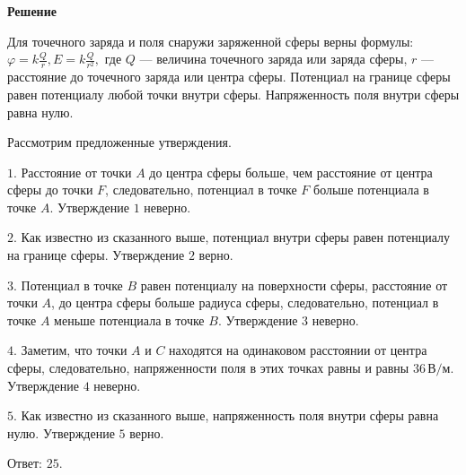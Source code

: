 \documentclass[12pt,a4paper]{article}
\begin{document}
{\begin{center}\end{center}
\par
}{
\smallskip\noindent\textbf{Решение}\par
Для точечного заряда и поля снаружи заряженной сферы верны формулы: $\varphi = k \frac{ Q}{ r } ,E=k \frac{ Q}{ r ^2 } ,$ где $Q$ — величина точечного заряда или заряда сферы, $r$ — расстояние до точечного заряда или центра сферы. Потенциал на границе сферы равен потенциалу любой точки внутри сферы. Напряженность поля внутри сферы равна нулю.\par
Рассмотрим предложенные утверждения.\par
$1$. Расстояние от точки $A$ до центра сферы больше, чем расстояние от центра сферы до точки $F$, следовательно, потенциал в точке $F$ больше потенциала в точке $A$. Утверждение $1$ неверно.\par
$2$. Как известно из сказанного выше, потенциал внутри сферы равен потенциалу на границе сферы. Утверждение $2$ верно.\par
$3$. Потенциал в точке $B$ равен потенциалу на поверхности сферы, расстояние от точки $A$, до центра сферы больше радиуса сферы, следовательно, потенциал в точке $A$ меньше потенциала в точке $B$. Утверждение $3$ неверно.\par
$4$. Заметим, что точки $A$ и $C$ находятся на одинаковом расстоянии от центра сферы, следовательно, напряженности поля в этих точках равны и равны $36 \,\text{В/м}$. Утверждение $4$ неверно.\par
$5$. Как известно из сказанного выше, напряженность поля внутри сферы равна нулю. Утверждение $5$ верно.\par
Ответ: $25$.\par
}
\end{document}
